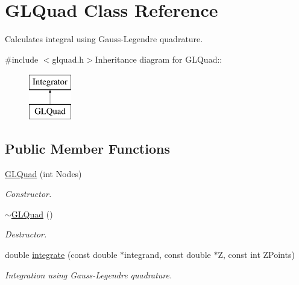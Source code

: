 \hypertarget{classGLQuad}{
\section{GLQuad Class Reference}
\label{db/d06/classGLQuad}
}


Calculates integral using Gauss-\/Legendre quadrature.  


{\ttfamily \#include $<$glquad.h$>$}Inheritance diagram for GLQuad::\begin{figure}[H]
\begin{center}
\leavevmode
\includegraphics[height=2cm]{db/d06/classGLQuad}
\end{center}
\end{figure}
\subsection*{Public Member Functions}
\begin{DoxyCompactItemize}
\item 
\hyperlink{classGLQuad_a835d29af2507b6b2716794d3371d2ba8}{GLQuad} (int Nodes)
\begin{DoxyCompactList}\small\item\em Constructor. \item\end{DoxyCompactList}\item 
\hypertarget{classGLQuad_ad37beb73af53a94ca95ee8eddfe207ab}{
\hyperlink{classGLQuad_ad37beb73af53a94ca95ee8eddfe207ab}{$\sim$GLQuad} ()}
\label{db/d06/classGLQuad_ad37beb73af53a94ca95ee8eddfe207ab}

\begin{DoxyCompactList}\small\item\em Destructor. \item\end{DoxyCompactList}\item 
double \hyperlink{classGLQuad_a951e36d849cfadc749a62218212802b6}{integrate} (const double $\ast$integrand, const double $\ast$Z, const int ZPoints)
\begin{DoxyCompactList}\small\item\em Integration using Gauss-\/Legendre quadrature. \item\end{DoxyCompactList}\end{DoxyCompactItemize}


